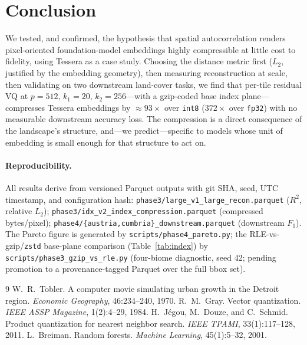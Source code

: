 \documentclass[11pt]{article}
\begin{document}
\section{Conclusion}

We tested, and confirmed, the hypothesis that spatial autocorrelation renders
pixel-oriented foundation-model embeddings highly compressible at little cost to
fidelity, using Tessera as a case study. Choosing the distance metric first
($L_2$, justified by the embedding geometry), then measuring reconstruction at
scale, then validating on two downstream land-cover tasks, we find that per-tile
residual VQ at $p=512,\,k_1=20,\,k_2=256$---with a gzip-coded base index plane---
compresses Tessera embeddings by ${\approx}93\times$ over \texttt{int8}
($372\times$ over \texttt{fp32}) with no measurable downstream accuracy loss. The
compression is a direct consequence of the
landscape's structure, and---we predict---specific to models whose unit of
embedding is small enough for that structure to act on.

\paragraph{Reproducibility.}
All results derive from versioned Parquet outputs with git SHA, seed, UTC
timestamp, and configuration hash:
\texttt{phase3/large\_v1\_large\_recon.parquet} ($R^2$, relative $L_2$);
\texttt{phase3/idx\_v2\_index\_compression.parquet} (compressed bytes/pixel);
\texttt{phase4/\{austria,cumbria\}\_downstream.parquet} (downstream $F_1$). The
Pareto figure is generated by \texttt{scripts/phase4\_pareto.py}; the
RLE-vs-gzip/\texttt{zstd} base-plane comparison (Table~\ref{tab:index}) by
\texttt{scripts/phase3\_gzip\_vs\_rle.py} (four-biome diagnostic, seed 42; pending
promotion to a provenance-tagged Parquet over the full bbox set).

\begin{thebibliography}{9}
 W.~R.\ Tobler. A computer movie simulating urban growth in
the Detroit region. \emph{Economic Geography}, 46:234--240, 1970.
 R.~M.\ Gray. Vector quantization. \emph{IEEE ASSP Magazine},
1(2):4--29, 1984.
 H.~J\'egou, M.\ Douze, and C.\ Schmid. Product quantization
for nearest neighbor search. \emph{IEEE TPAMI}, 33(1):117--128, 2011.
 L.\ Breiman. Random forests. \emph{Machine Learning},
45(1):5--32, 2001.
\end{thebibliography}
\end{document}

